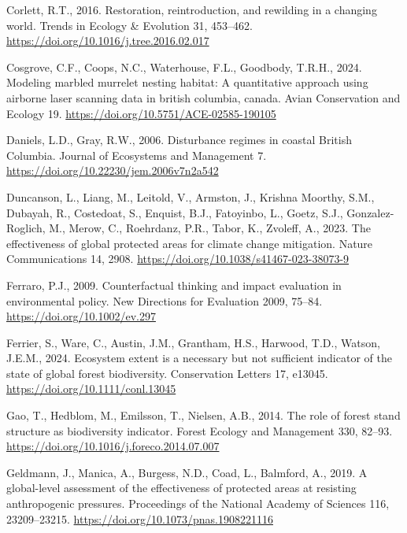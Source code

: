 \documentclass[
]{agujournal2019}
\newlength{\cslhangindent}
\newenvironment{CSLReferences}[2] %
 {\begin{list}{}{%
  \setlength{\itemindent}{0pt}
  \setlength{\leftmargin}{0pt}
  \setlength{\parsep}{0pt}
  \ifodd #1
   \setlength{\leftmargin}{\cslhangindent}
   \setlength{\itemindent}{-1\cslhangindent}
  \fi
  \setlength{\itemsep}{#2\baselineskip}}}
 {\end{list}}
\begin{document}
\begin{CSLReferences}{1}{0}
Corlett, R.T., 2016. Restoration, reintroduction, and rewilding in a
changing world. Trends in Ecology \& Evolution 31, 453--462.
\url{https://doi.org/10.1016/j.tree.2016.02.017}

Cosgrove, C.F., Coops, N.C., Waterhouse, F.L., Goodbody, T.R.H., 2024.
Modeling marbled murrelet nesting habitat: A quantitative approach using
airborne laser scanning data in british columbia, canada. Avian
Conservation and Ecology 19.
\url{https://doi.org/10.5751/ACE-02585-190105}

Daniels, L.D., Gray, R.W., 2006. Disturbance regimes in coastal British
Columbia. Journal of Ecosystems and Management 7.
\url{https://doi.org/10.22230/jem.2006v7n2a542}

Duncanson, L., Liang, M., Leitold, V., Armston, J., Krishna Moorthy,
S.M., Dubayah, R., Costedoat, S., Enquist, B.J., Fatoyinbo, L., Goetz,
S.J., Gonzalez-Roglich, M., Merow, C., Roehrdanz, P.R., Tabor, K.,
Zvoleff, A., 2023. The effectiveness of global protected areas for
climate change mitigation. Nature Communications 14, 2908.
\url{https://doi.org/10.1038/s41467-023-38073-9}

Ferraro, P.J., 2009. Counterfactual thinking and impact evaluation in
environmental policy. New Directions for Evaluation 2009, 75--84.
\url{https://doi.org/10.1002/ev.297}

Ferrier, S., Ware, C., Austin, J.M., Grantham, H.S., Harwood, T.D.,
Watson, J.E.M., 2024. Ecosystem extent is a necessary but not sufficient
indicator of the state of global forest biodiversity. Conservation
Letters 17, e13045. \url{https://doi.org/10.1111/conl.13045}

Gao, T., Hedblom, M., Emilsson, T., Nielsen, A.B., 2014. The role of
forest stand structure as biodiversity indicator. Forest Ecology and
Management 330, 82--93.
\url{https://doi.org/10.1016/j.foreco.2014.07.007}

Geldmann, J., Manica, A., Burgess, N.D., Coad, L., Balmford, A., 2019. A
global-level assessment of the effectiveness of protected areas at
resisting anthropogenic pressures. Proceedings of the National Academy
of Sciences 116, 23209--23215.
\url{https://doi.org/10.1073/pnas.1908221116}


\end{CSLReferences}
\end{document}
